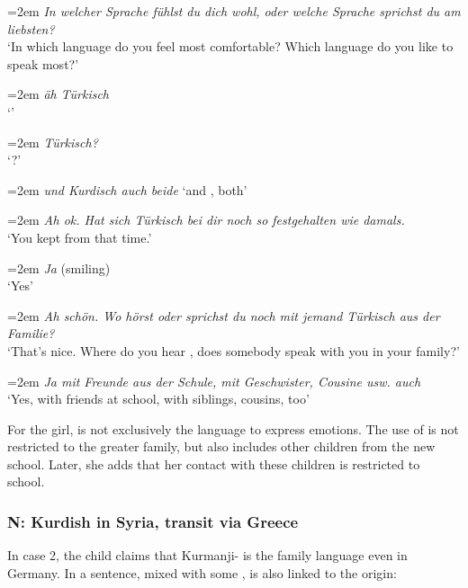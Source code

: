 \documentclass[output=paper,colorlinks,citecolor=brown]{langscibook}
\newenvironment{interview}{
  \setlength{\leftskip}{2.5em} %
  \setlength{\rightskip}{2.5em} %
  \setlength{\parindent}{0pt} %
  \vspace{\topsep} %
}{
  \vspace{\topsep} %
}
\newcommand{\speaker}[1]{%
  \noindent\hangindent=2em\makebox[1.5em][l]{#1:}\hspace{0.5em}%
}
\newcommand{\myattrib}[1]{%
    \attrib{#1}
}
\begin{document}
\begin{interview}\label{ch2.5.ex.4}
\speaker{I}\textit{In welcher Sprache fühlst du dich wohl, oder welche Sprache sprichst du am liebsten?} \\
`In which language do you feel most comfortable? Which language do you like to speak most?' 

\speaker{Z}\textit{äh Türkisch} \\
`' 

\speaker{I}\textit{Türkisch?} \\
`?' 

\speaker{MA}\textit{und Kurdisch auch beide} `and , both'

\speaker{I}\textit{Ah ok. Hat sich Türkisch bei dir noch so festgehalten wie damals.} \\
`You kept  from that time.' 

\speaker{Z}\textit{Ja} (smiling) \\
`Yes' 

\speaker{I}\textit{Ah schön. Wo hörst oder sprichst du noch mit jemand Türkisch aus der Familie?} \\
`That's nice. Where do you hear , does somebody speak with you  in your family?' 

\speaker{Z}\textit{Ja mit Freunde aus der Schule, mit Geschwister, Cousine usw. auch} \\
`Yes, with friends at school, with siblings, cousins, too' 
\myattrib{Int 2\_Z, 36--49}
\end{interview}

For the girl,  is not exclusively the language to express emotions. The use of  is not restricted to the greater family, but also includes other children from the new school. Later, she adds that her contact with these children is restricted to school.
 
\subsubsection{N: Kurdish in Syria, transit via Greece}\label{ch2.5.ss.4.2.2}

In case 2, the child claims that Kurmanji- is the family language even in Germany. In a sentence, mixed with some ,  is also linked to the origin:
\end{document}
